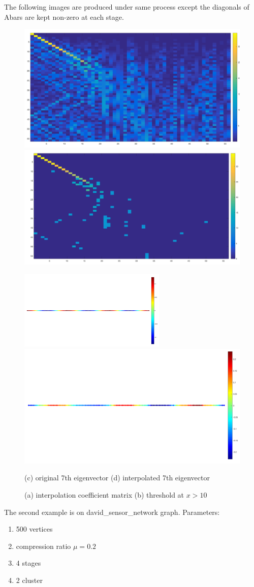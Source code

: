 \documentclass[a4paper]{article}
\begin{document}
The following images are produced under same process except the diagonals of Abars are kept non-zero at each stage.
\begin{figure}[H]
\centering
\includegraphics[width = 7 cm]{0629/original/coefficients_path_graph_4_stages}
\includegraphics[width = 7 cm]{0629/original/coefficients_path_graph_4_stages_threshold}

\includegraphics[width = 7cm]{0629/original/7th_eigen}
\includegraphics[width = 7 cm]{0629/original/7th_eigen_interpolated}
\caption{ (a) interpolation coefficient matrix (b) threshold at $x>10$ }
{(c) original 7th eigenvector (d) interpolated 7th eigenvector}
\end{figure}



The second example is on david\_sensor\_network graph. Parameters:
\begin{enumerate}
\item 500 vertices
\item compression ratio $\mu = 0.2$
\item 4 stages
\item 2 cluster
\end{enumerate}
\end{document}

